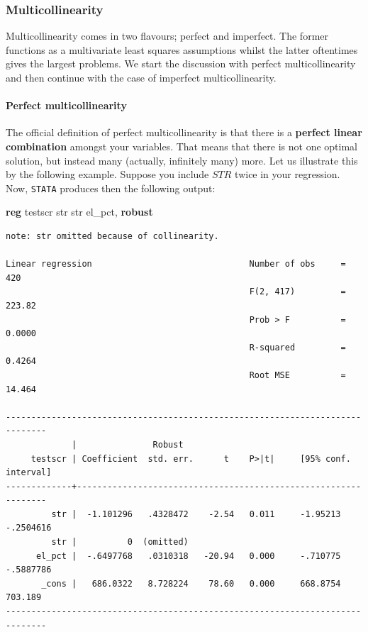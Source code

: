 \documentclass[
]{book}
\newenvironment{Shaded}{\begin{snugshade}}{\end{snugshade}}
\newcommand{\KeywordTok}[1]{\textcolor[rgb]{0.13,0.29,0.53}{\textbf{#1}}}
\newcommand{\NormalTok}[1]{#1}
\begin{document}
\hypertarget{multicollinearity}{%
\subsubsection{Multicollinearity}\label{multicollinearity}}

Multicollinearity comes in two flavours; perfect and imperfect. The former functions as a multivariate least squares assumptions whilst the latter oftentimes gives the largest problems. We start the discussion with perfect multicollinearity and then continue with the case of imperfect multicollinearity.

\hypertarget{perfect-multicollinearity}{%
\paragraph{Perfect multicollinearity}\label{perfect-multicollinearity}}

The official definition of perfect multicollinearity is that there is a \textbf{perfect linear combination} amongst your variables. That means that there is not one optimal solution, but instead many (actually, infinitely many) more. Let us illustrate this by the following example. Suppose you include \(STR\) twice in your regression. Now, \texttt{STATA} produces then the following output:

\begin{Shaded}
\begin{Highlighting}[]
\KeywordTok{reg}\NormalTok{ testscr str str el\_pct, }\KeywordTok{robust}
\end{Highlighting}
\end{Shaded}

\begin{verbatim}
note: str omitted because of collinearity.

Linear regression                               Number of obs     =        420
                                                F(2, 417)         =     223.82
                                                Prob > F          =     0.0000
                                                R-squared         =     0.4264
                                                Root MSE          =     14.464

------------------------------------------------------------------------------
             |               Robust
     testscr | Coefficient  std. err.      t    P>|t|     [95% conf. interval]
-------------+----------------------------------------------------------------
         str |  -1.101296   .4328472    -2.54   0.011     -1.95213   -.2504616
         str |          0  (omitted)
      el_pct |  -.6497768   .0310318   -20.94   0.000     -.710775   -.5887786
       _cons |   686.0322   8.728224    78.60   0.000     668.8754     703.189
------------------------------------------------------------------------------
\end{verbatim}
\end{document}
